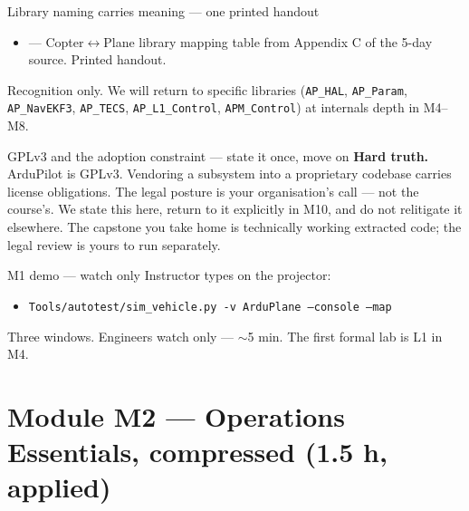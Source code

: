 \documentclass[aspectratio=169,11pt]{beamer}
\begin{document}
\begin{frame}{Library naming carries meaning --- one printed handout}
  \begin{itemize}
    \item {} --- Copter$\leftrightarrow$Plane library mapping table from Appendix C of the 5-day source. Printed handout.
  \end{itemize}
  \vfill
  Recognition only. We will return to specific libraries (\texttt{AP\_HAL}, \texttt{AP\_Param}, \texttt{AP\_NavEKF3}, \texttt{AP\_TECS}, \texttt{AP\_L1\_Control}, \texttt{APM\_Control}) at internals depth in M4--M8.
\end{frame}

\begin{frame}[allowframebreaks]{GPLv3 and the adoption constraint --- state it once, move on}
  \textbf{Hard truth.} ArduPilot is GPLv3.
  \vfill
  Vendoring a subsystem into a proprietary codebase carries license obligations. The legal posture is your organisation's call --- not the course's.
  \vfill
  We state this here, return to it explicitly in M10, and do not relitigate it elsewhere. The capstone you take home is technically working extracted code; the legal review is yours to run separately.
\end{frame}

\begin{frame}[allowframebreaks]{M1 demo --- watch only}
  Instructor types on the projector:
  \begin{itemize}
    \item[\$] \texttt{Tools/autotest/sim\_vehicle.py -v ArduPlane --console --map}
  \end{itemize}
  \vfill
  Three windows. Engineers watch only --- $\sim$5 min. The first formal lab is L1 in M4.
\end{frame}

\section{Module M2 --- Operations Essentials, compressed (1.5 h, applied)}
\end{document}
